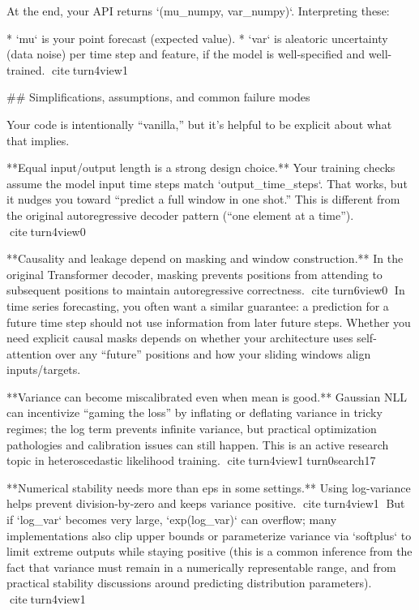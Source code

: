 \documentclass[a4paper]{article}
\begin{document}
    At the end, your API returns `(mu_numpy, var_numpy)`. Interpreting these:
    
    * `mu` is your point forecast (expected value).
    * `var` is aleatoric uncertainty (data noise) per time step and feature, if the model is well-specified and well-trained. citeturn4view1
    
    ## Simplifications, assumptions, and common failure modes
    
    Your code is intentionally “vanilla,” but it’s helpful to be explicit about what that implies.
    
    **Equal input/output length is a strong design choice.** Your training checks assume the model input time steps match `output_time_steps`. That works, but it nudges you toward “predict a full window in one shot.” This is different from the original autoregressive decoder pattern (“one element at a time”). citeturn4view0
    
    **Causality and leakage depend on masking and window construction.** In the original Transformer decoder, masking prevents positions from attending to subsequent positions to maintain autoregressive correctness. citeturn6view0
    In time series forecasting, you often want a similar guarantee: a prediction for a future time step should not use information from later future steps. Whether you need explicit causal masks depends on whether your architecture uses self-attention over any “future” positions and how your sliding windows align inputs/targets.
    
    **Variance can become miscalibrated even when mean is good.** Gaussian NLL can incentivize “gaming the loss” by inflating or deflating variance in tricky regimes; the log term prevents infinite variance, but practical optimization pathologies and calibration issues can still happen. This is an active research topic in heteroscedastic likelihood training. citeturn4view1turn0search17
    
    **Numerical stability needs more than eps in some settings.** Using log-variance helps prevent division-by-zero and keeps variance positive. citeturn4view1
    But if `log_var` becomes very large, `exp(log_var)` can overflow; many implementations also clip upper bounds or parameterize variance via `softplus` to limit extreme outputs while staying positive (this is a common inference from the fact that variance must remain in a numerically representable range, and from practical stability discussions around predicting distribution parameters). citeturn4view1
    
\end{document}
